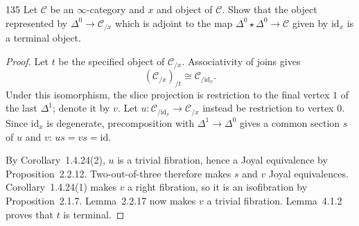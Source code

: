 \begin{exercise}{135}
Let $\mathcal C$ be an $\infty$-category and $x$ and object of $\mathcal C$. Show that the object
represented by $\Delta^0\to\mathcal C_{/x}$ which is adjoint to the map $\Delta^0\star\Delta^0\to\mathcal C$ given by $\mathrm{id}_x$ is a
terminal object.

\begin{proof}
Let $t$ be the specified object of $\mathcal C_{/x}$.
Associativity of joins gives
\[
 (\mathcal C_{/x})_{/t}\cong\mathcal C_{/\mathrm{id}_x}.
\]
Under this isomorphism, the slice projection is restriction to the final
vertex $1$ of the last $\Delta^1$; denote it by $v$.
Let $u\colon\mathcal C_{/\mathrm{id}_x}\to\mathcal C_{/x}$ instead be
restriction to vertex $0$.
Since $\mathrm{id}_x$ is degenerate, precomposition with
$\Delta^1\to\Delta^0$ gives a common section $s$ of $u$ and $v$:
$us=vs=\mathrm{id}$.

\setlength{\emergencystretch}{2em}
By Corollary~1.4.24(2), $u$ is a trivial fibration, hence a Joyal
equivalence by Proposition~2.2.12.
Two-out-of-three therefore makes $s$ and $v$ Joyal equivalences.
Corollary~1.4.24(1) makes $v$ a right fibration, so it is an
isofibration by Proposition~2.1.7.
Lemma~2.2.17 now makes $v$ a trivial fibration.
Lemma~4.1.2 proves that $t$ is terminal.
\end{proof}
\end{exercise}
